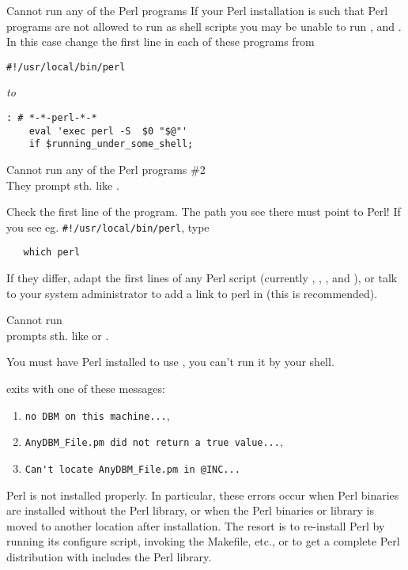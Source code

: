 \begin{htmllist}
\item [Cannot run any of the Perl programs]
If your Perl installation is such that Perl programs are not allowed 
to run as shell scripts you may be unable to run  ,  
and  . In this case change the first line in each of these
programs from
\begin{verbatim}
#!/usr/local/bin/perl
\end{verbatim}

\emph{to}

\begin{verbatim}
: # *-*-perl-*-*
    eval 'exec perl -S  $0 "$@"'
    if $running_under_some_shell; 
\end{verbatim}


\item [Cannot run any of the Perl programs \#2]\hfill\\
They prompt sth. like .

Check the first line of the program.
The path you see there must point to Perl!
If you see eg. \verb|#!/usr/local/bin/perl|, type
\begin{verbatim}
   which perl
\end{verbatim}
If they differ, adapt the first lines of any Perl script (currently
, , , and ),
or talk to your system administrator to add a link to perl in
 (this is recommended).


\item [Cannot run \fn{latex2html}]\hfill\\
 prompts sth. like  or
.

You must have Perl installed to use \latextohtml, you can't run it
by your shell.


\item [\fn{latex2html} exits with one of these messages:]\hfill

\begin{enumerate}
\item \verb/no DBM on this machine.../,
\item \verb/AnyDBM_File.pm did not return a true value.../,
\item \verb/Can't locate AnyDBM_File.pm in @INC.../
\end{enumerate}

Perl is not installed properly.
In particular, these errors occur when Perl binaries are installed
without the Perl library, or when the Perl binaries or library
is moved to another location after installation.
The resort is to re-install Perl by running its configure script,
invoking the Makefile, etc., or to get a complete Perl distribution
with includes the Perl library.




\end{htmllist}
